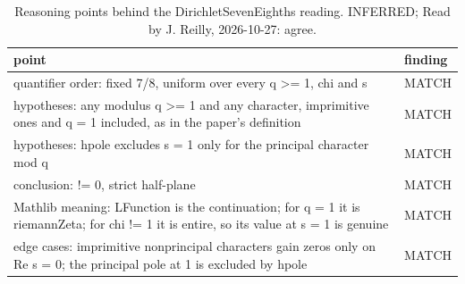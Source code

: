 \begin{table}[!htbp]
\caption{Reasoning points behind the DirichletSevenEighths reading. INFERRED; Read by J. Reilly, 2026-10-27: agree.}\label{tab:points-DirichletSevenEighths}
\scriptsize\setlength{\tabcolsep}{3pt}\renewcommand{\arraystretch}{0.95}
\begin{tabularx}{\textwidth}{@{}>{\raggedright\arraybackslash}Xl@{}}
\toprule
point & finding \\
\midrule
quantifier order: fixed 7/8, uniform over every q >= 1, chi and s & MATCH \\
hypotheses: any modulus q >= 1 and any character, imprimitive ones and q = 1 included, as in the paper's definition & MATCH \\
hypotheses: hpole excludes s = 1 only for the principal character mod q & MATCH \\
conclusion: != 0, strict half-plane & MATCH \\
Mathlib meaning: LFunction is the continuation; for q = 1 it is riemannZeta; for chi != 1 it is entire, so its value at s = 1 is genuine & MATCH \\
edge cases: imprimitive nonprincipal characters gain zeros only on Re s = 0; the principal pole at 1 is excluded by hpole & MATCH \\
\bottomrule
\end{tabularx}
\end{table}

